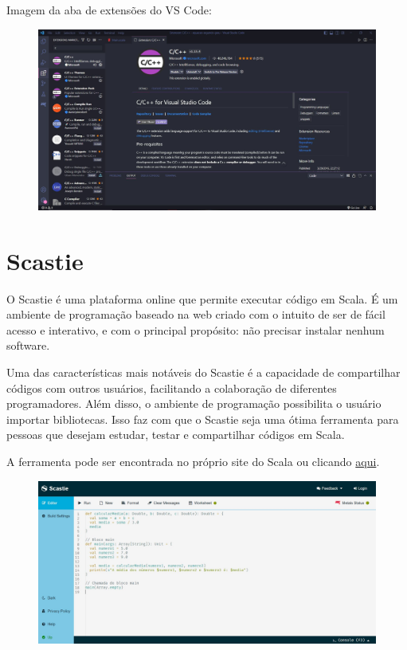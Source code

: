	Imagem da aba de extensões do VS Code: 
	\begin{figure}[H]
		\centering
		\includegraphics[width=17.5cm]{Pictures/Ferr1.4.jpg}
		\caption{}
		\label{fig:ferr4}
	\end{figure}
	

    \section{Scastie}
    O Scastie é uma plataforma online que permite executar código em Scala. É um ambiente de programação baseado na web criado com o intuito de ser de fácil acesso e interativo, e com o principal propósito: não precisar instalar nenhum software.
    
    Uma das características mais notáveis do Scastie é a capacidade de compartilhar códigos com outros usuários, facilitando a colaboração de diferentes programadores. Além disso, o ambiente de programação possibilita o usuário importar bibliotecas. Isso faz com que o Scastie seja uma ótima ferramenta para pessoas que desejam estudar, testar e compartilhar códigos em Scala.
    
    A ferramenta pode ser encontrada no próprio site do Scala ou clicando \href{https://scastie.scala-lang.org}{aqui}.
    
    \begin{figure}[H]
    	\centering
    	\includegraphics[width=17.5cm]{Pictures/Ferr2.1.jpg}
    	\caption{}
    	\label{fig:ferr1}
    \end{figure}

